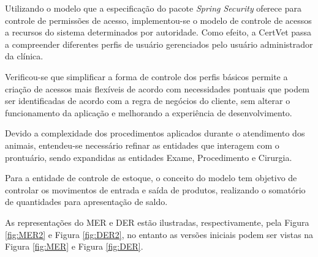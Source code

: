 \documentclass[
    12pt,               %
    openright,          %
    oneside,
    a4paper,            %
    BIBLATEX,           %
    TODO,               %
    english,            %
    brazil              %
    ]{ifsp-spo-inf-ctds}
\begin{document}
    Utilizando o modelo que a especificação do pacote \emph{Spring Security} oferece para controle de permissões de acesso, implementou-se o modelo de controle de acessos a recursos do sistema determinados por autoridade. Como efeito, a CertVet passa a compreender diferentes perfis de usuário gerenciados pelo usuário administrador da clínica.

    Verificou-se que simplificar a forma de controle dos perfis básicos permite a criação de acessos mais flexíveis de acordo com necessidades pontuais que podem ser identificadas de acordo com a regra de negócios do cliente, sem alterar o funcionamento da aplicação e melhorando a experiência de desenvolvimento.

    Devido a complexidade dos procedimentos aplicados durante o atendimento dos animais, entendeu-se necessário refinar as entidades que interagem com o prontuário, sendo expandidas as entidades Exame, Procedimento e Cirurgia.

    Para a entidade de controle de estoque, o conceito do modelo tem objetivo de controlar os movimentos de entrada e saída de produtos, realizando o somatório de quantidades para apresentação de saldo.

    As representações do MER e DER  estão ilustradas, respectivamente, pela Figura \ref{fig:MER2} e Figura \ref{fig:DER2}, no entanto as versões iniciais podem ser vistas na Figura \ref{fig:MER} e Figura \ref{fig:DER}.
\end{document}
